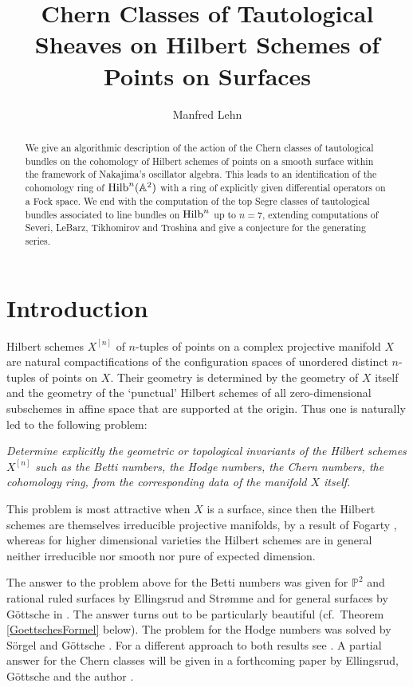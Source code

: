 \documentclass[twoside,11pt]{article}
\newcommand{\IA}{{\mathbb A}}
\newcommand{\IP}{{\mathbb P}}
\newcommand{\Hilb}{{\rm Hilb}}
\begin{document}
\title{Chern Classes of Tautological Sheaves on \linebreak Hilbert Schemes of Points on Surfaces}
\author{Manfred Lehn}
\date{}
\maketitle

\begin{abstract}
\noindent
We give an algorithmic description of the action of the Chern classes of tautological bundles on the cohomology of Hilbert schemes of points on a smooth surface within the framework of Nakajima's oscillator algebra.
This leads to an identification of the cohomology ring of $\Hilb^n(\IA^2)$
with a ring of explicitly given differential operators on a Fock space. We
end with the computation of the top Segre classes of tautological bundles associated to line bundles on $\Hilb^n$ up to $n=7$, extending computations of Severi, LeBarz, Tikhomirov and Troshina and give a conjecture for the generating series.
\end{abstract}

\section*{Introduction}

Hilbert schemes $X^{[n]}$ of $n$-tuples of points on a complex 
projective manifold $X$ 
are natural compactifications of the configuration spaces of unordered
distinct $n$-tuples of points on $X$. Their geometry is determined by the
geometry of $X$ itself and the geometry of the `punctual' Hilbert schemes
of all zero-dimensional subschemes in affine space that are supported at the
origin. Thus one is naturally led to the following problem:

{\em Determine
explicitly the geometric or topological invariants of the Hilbert schemes 
$X^{[n]}$ such as the Betti numbers, the Hodge numbers, the Chern numbers, the 
cohomology ring, from the corresponding data of the manifold $X$ itself.}

This problem is most attractive when $X$ is a surface, since then the Hilbert schemes are themselves irreducible projective manifolds,
by a result of  Fogarty  \cite{Fogarty},
whereas for higher dimensional varieties the Hilbert schemes are in general
neither irreducible nor smooth nor pure of expected dimension. 

The answer to the problem above for the Betti numbers was given for $\IP^2$ and rational ruled surfaces by Ellingsrud and Str\o{}mme \cite{EllStr1} and for general surfaces by G\"ottsche in \cite{Goettsche}. The answer turns out to be 
particularly beautiful (cf.\ Theorem \ref{GoettschesFormel} below).
The problem for the Hodge numbers was solved by  S\"orgel  and  G\"ottsche
\cite{GoettscheSoergel}. For a different approach to both results see 
\cite{Cheah}. A partial answer for the Chern classes will be given in a forthcoming paper by Ellingsrud, G\"ottsche and the author \cite{EllingsrudGoettscheLehn}.
\end{document}

